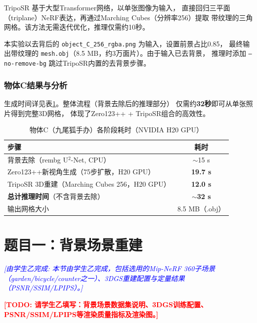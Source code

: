 \documentclass{article}
\newcommand{\placeholder}[1]{\textcolor{red}{\textbf{[TODO: #1]}}}
\newcommand{\tmate}[2]{\textcolor{blue}{\textit{[由#1完成: #2]}}}
\begin{document}
TripoSR \cite{tochilkin2024triposr}基于大型Transformer网络，以单张图像为输入，
直接回归三平面（triplane）NeRF表达，再通过Marching Cubes（分辨率256）提取
带纹理的三角网格。该方法无需迭代优化，推理仅需约10秒。

本实验以去背后的 \texttt{object\_C\_256\_rgba.png} 为输入，设置前景占比0.85，
最终输出带纹理的 \texttt{mesh.obj}（8.5 MB，约3万面片）。由于输入已去背景，
推理时添加 \texttt{--no-remove-bg} 跳过TripoSR内置的去背景步骤。

\subsubsection{物体C结果与分析}
生成时间详见表\ref{tab:objC_timing}。整体流程（背景去除后的推理部分）
仅需约\textbf{32秒}即可从单张照片得到完整3D网格，
体现了Zero123++ + TripoSR组合的高效性。

\begin{table}[h]
  \centering
  \caption{物体C（九尾狐手办）各阶段耗时（NVIDIA H20 GPU）}
  \label{tab:objC_timing}
  \begin{tabular}{lc}
    \toprule
    步骤 & 耗时 \\
    \midrule
    背景去除（rembg U$^2$-Net, CPU） & $\sim$15 s \\
    Zero123++新视角生成（75步扩散，H20 GPU） & \textbf{19.7 s} \\
    TripoSR 3D重建（Marching Cubes 256，H20 GPU） & \textbf{12.0 s} \\
    \textbf{总计推理时间}（不含背景去除） & \textbf{$\sim$32 s} \\
    输出网格大小 & 8.5 MB（.obj） \\
    \bottomrule
  \end{tabular}
\end{table}

\section{题目一：背景场景重建}
\label{sec:background}

\tmate{学生乙}{本节由学生乙完成，包括选用的Mip-NeRF 360子场景
（garden/bicycle/counter之一）、3DGS重建配置与定量结果（PSNR/SSIM/LPIPS）。}

\placeholder{请学生乙填写：背景场景数据集说明、3DGS训练配置、PSNR/SSIM/LPIPS等渲染质量指标及渲染图。}

\end{document}
